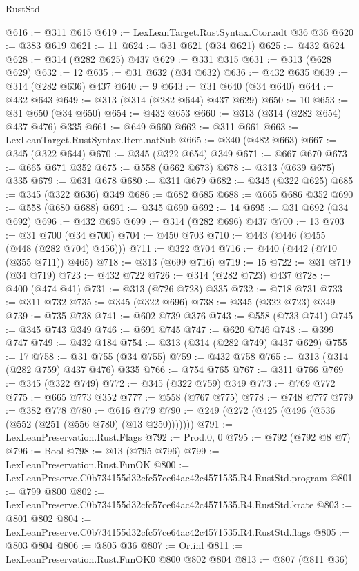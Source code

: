 \begin{lexlean}{RustStd}
\begin{coremodule}
@616 := @311 @615
@619 := LexLeanTarget.RustSyntax.Ctor.adt @36 @36
@620 := @383 @619
@621 := 11
@624 := @31 @621 (@34 @621)
@625 := @432 @624
@628 := @314 (@282 @625) @437
@629 := @331 @315
@631 := @313 (@628 @629)
@632 := 12
@635 := @31 @632 (@34 @632)
@636 := @432 @635
@639 := @314 (@282 @636) @437
@640 := 9
@643 := @31 @640 (@34 @640)
@644 := @432 @643
@649 := @313 (@314 (@282 @644) @437 @629)
@650 := 10
@653 := @31 @650 (@34 @650)
@654 := @432 @653
@660 := @313 (@314 (@282 @654) @437 @476) @335
@661 := @649 @660
@662 := @311 @661
@663 := LexLeanTarget.RustSyntax.Item.natSub
@665 := @340 (@482 @663)
@667 := @345 (@322 @644)
@670 := @345 (@322 @654) @349
@671 := @667 @670
@673 := @665 @671 @352
@675 := @558 (@662 @673)
@678 := @313 (@639 @675) @335
@679 := @631 @678
@680 := @311 @679
@682 := @345 (@322 @625)
@685 := @345 (@322 @636) @349
@686 := @682 @685
@688 := @665 @686 @352
@690 := @558 (@680 @688)
@691 := @345 @690
@692 := 14
@695 := @31 @692 (@34 @692)
@696 := @432 @695
@699 := @314 (@282 @696) @437
@700 := 13
@703 := @31 @700 (@34 @700)
@704 := @450 @703
@710 := @443 (@446 (@455 (@448 (@282 @704) @456)))
@711 := @322 @704
@716 := @440 (@442 (@710 (@355 @711)) @465)
@718 := @313 (@699 @716)
@719 := 15
@722 := @31 @719 (@34 @719)
@723 := @432 @722
@726 := @314 (@282 @723) @437
@728 := @400 (@474 @41)
@731 := @313 (@726 @728) @335
@732 := @718 @731
@733 := @311 @732
@735 := @345 (@322 @696)
@738 := @345 (@322 @723) @349
@739 := @735 @738
@741 := @602 @739 @376
@743 := @558 (@733 @741)
@745 := @345 @743 @349
@746 := @691 @745
@747 := @620 @746
@748 := @399 @747
@749 := @432 @184
@754 := @313 (@314 (@282 @749) @437 @629)
@755 := 17
@758 := @31 @755 (@34 @755)
@759 := @432 @758
@765 := @313 (@314 (@282 @759) @437 @476) @335
@766 := @754 @765
@767 := @311 @766
@769 := @345 (@322 @749)
@772 := @345 (@322 @759) @349
@773 := @769 @772
@775 := @665 @773 @352
@777 := @558 (@767 @775)
@778 := @748 @777
@779 := @382 @778
@780 := @616 @779
@790 := @249 (@272 (@425 (@496 (@536 (@552 (@251 (@556 @780) (@13 @250)))))))
@791 := LexLeanPreservation.Rust.Flags
@792 := Prod.{0, 0}
@795 := @792 (@792 @8 @7)
@796 := Bool
@798 := @13 (@795 @796)
@799 := LexLeanPreservation.Rust.FunOK
@800 := LexLeanPreserve.C0b734155d32cfc57ce64ac42c4571535.R4.RustStd.program
@801 := @799 @800
@802 := LexLeanPreserve.C0b734155d32cfc57ce64ac42c4571535.R4.RustStd.krate
@803 := @801 @802
@804 := LexLeanPreserve.C0b734155d32cfc57ce64ac42c4571535.R4.RustStd.flags
@805 := @803 @804
@806 := @805 @36
@807 := Or.inl
@811 := LexLeanPreservation.Rust.FunOK0 @800 @802 @804
@813 := @807 (@811 @36)

\end{coremodule}
\end{lexlean}
